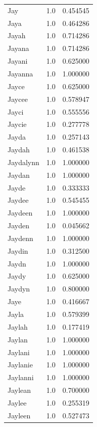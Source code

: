 \documentclass[
  letterpaper,
  DIV=11,
  numbers=noendperiod]{scrreprt}
\begin{document}
\begin{tabular}{lrr}
Jay             &   1.0 &   0.454545 \\
Jaya            &   1.0 &   0.464286 \\
Jayah           &   1.0 &   0.714286 \\
Jayana          &   1.0 &   0.714286 \\
Jayani          &   1.0 &   0.625000 \\
Jayanna         &   1.0 &   1.000000 \\
Jayce           &   1.0 &   0.625000 \\
Jaycee          &   1.0 &   0.578947 \\
Jayci           &   1.0 &   0.555556 \\
Jaycie          &   1.0 &   0.277778 \\
Jayda           &   1.0 &   0.257143 \\
Jaydah          &   1.0 &   0.461538 \\
Jaydalynn       &   1.0 &   1.000000 \\
Jaydan          &   1.0 &   1.000000 \\
Jayde           &   1.0 &   0.333333 \\
Jaydee          &   1.0 &   0.545455 \\
Jaydeen         &   1.0 &   1.000000 \\
Jayden          &   1.0 &   0.045662 \\
Jaydenn         &   1.0 &   1.000000 \\
Jaydin          &   1.0 &   0.312500 \\
Jaydn           &   1.0 &   1.000000 \\
Jaydy           &   1.0 &   0.625000 \\
Jaydyn          &   1.0 &   0.800000 \\
Jaye            &   1.0 &   0.416667 \\
Jayla           &   1.0 &   0.579399 \\
Jaylah          &   1.0 &   0.177419 \\
Jaylan          &   1.0 &   1.000000 \\
Jaylani         &   1.0 &   1.000000 \\
Jaylanie        &   1.0 &   1.000000 \\
Jaylanni        &   1.0 &   1.000000 \\
Jaylean         &   1.0 &   0.700000 \\
Jaylee          &   1.0 &   0.255319 \\
Jayleen         &   1.0 &   0.527473 \\

\end{tabular}
\end{document}
